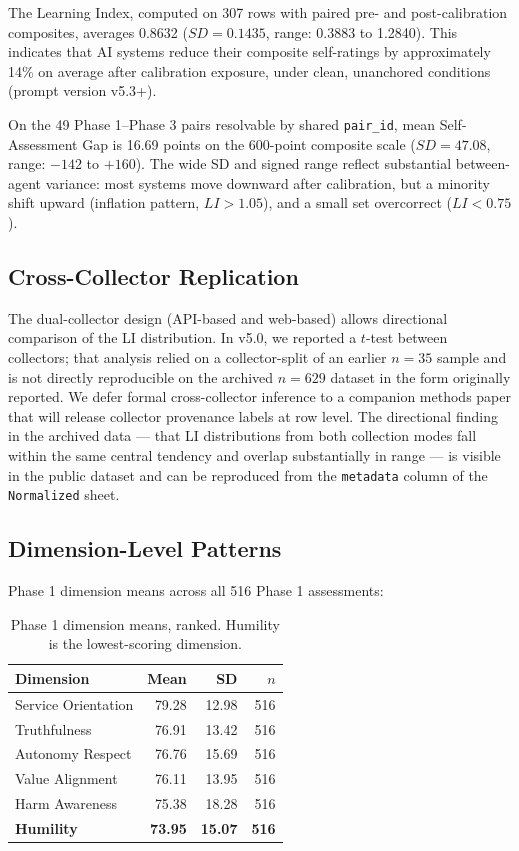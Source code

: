 \documentclass[11pt,a4paper]{article}
\begin{document}
The Learning Index, computed on 307 rows with paired pre- and post-calibration composites, averages 0.8632 ($SD = 0.1435$, range: 0.3883 to 1.2840). This indicates that AI systems reduce their composite self-ratings by approximately 14\% on average after calibration exposure, under clean, unanchored conditions (prompt version v5.3+).

On the 49 Phase 1--Phase 3 pairs resolvable by shared \texttt{pair\_id}, mean Self-Assessment Gap is 16.69 points on the 600-point composite scale ($SD = 47.08$, range: $-142$ to $+160$). The wide SD and signed range reflect substantial between-agent variance: most systems move downward after calibration, but a minority shift upward (inflation pattern, $LI > 1.05$), and a small set overcorrect ($LI < 0.75$).

\subsection{Cross-Collector Replication}

The dual-collector design (API-based and web-based) allows directional comparison of the LI distribution. In v5.0, we reported a $t$-test between collectors; that analysis relied on a collector-split of an earlier $n = 35$ sample and is not directly reproducible on the archived $n = 629$ dataset in the form originally reported. We defer formal cross-collector inference to a companion methods paper that will release collector provenance labels at row level. The directional finding in the archived data --- that LI distributions from both collection modes fall within the same central tendency and overlap substantially in range --- is visible in the public dataset and can be reproduced from the \texttt{metadata} column of the \texttt{Normalized} sheet.

\subsection{Dimension-Level Patterns}

Phase 1 dimension means across all 516 Phase 1 assessments:

\begin{table}[H]
\centering
\small
\begin{tabular}{lrrr}
\toprule
\textbf{Dimension} & \textbf{Mean} & \textbf{SD} & \textbf{$n$} \\
\midrule
Service Orientation & 79.28 & 12.98 & 516 \\
Truthfulness        & 76.91 & 13.42 & 516 \\
Autonomy Respect    & 76.76 & 15.69 & 516 \\
Value Alignment     & 76.11 & 13.95 & 516 \\
Harm Awareness      & 75.38 & 18.28 & 516 \\
\textbf{Humility}   & \textbf{73.95} & \textbf{15.07} & \textbf{516} \\
\bottomrule
\end{tabular}
\caption{Phase 1 dimension means, ranked. Humility is the lowest-scoring dimension.}
\end{table}
\end{document}
